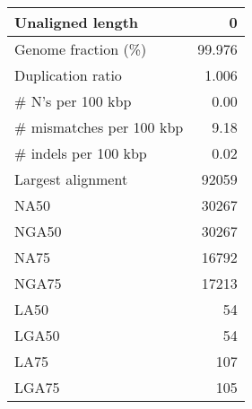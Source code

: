 \documentclass[12pt,a4paper]{article}
\begin{document}
\begin{table}[ht]
\begin{center}
\begin{tabular}{|l*{1}{|r}|}
Unaligned length & 0 \\ \hline
Genome fraction (\%) & 99.976 \\ \hline
Duplication ratio & 1.006 \\ \hline
\# N's per 100 kbp & 0.00 \\ \hline
\# mismatches per 100 kbp & 9.18 \\ \hline
\# indels per 100 kbp & 0.02 \\ \hline
Largest alignment & 92059 \\ \hline
NA50 & 30267 \\ \hline
NGA50 & 30267 \\ \hline
NA75 & 16792 \\ \hline
NGA75 & 17213 \\ \hline
LA50 & 54 \\ \hline
LGA50 & 54 \\ \hline
LA75 & 107 \\ \hline
LGA75 & 105 \\ \hline
\end{tabular}
\end{center}
\end{table}
\end{document}
